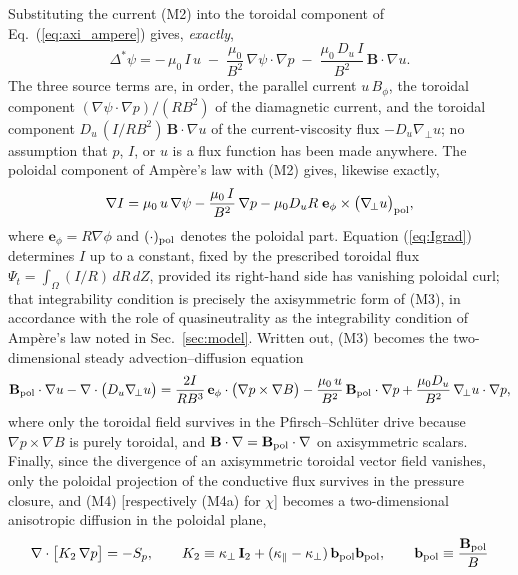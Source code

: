 \documentclass[english]{article}
\newcommand{\bB}{\mathbf{B}}
\newcommand{\bb}{\mathbf{b}}
\newcommand{\bI}{\mathbf{I}}
\newcommand{\gradperp}{\nabla_{\!\perp}}
\begin{document}
Substituting the current (M2) into the toroidal component of Eq.~(\ref{eq:axi_ampere}) gives,
\emph{exactly},
\begin{equation}
\boxed{\;
\Delta^*\psi
=-\,\mu_0\,I\,u
\;-\;\frac{\mu_0}{B^{2}}\,\nabla\psi\cdot\nabla p
\;-\;\frac{\mu_0\,D_u\,I}{B^{2}}\,\bB\cdot\nabla u .
\;}
\label{eq:GSgen}
\end{equation}
The three source terms are, in order, the parallel current $u\,B_\phi$, the toroidal component
$(\nabla\psi\cdot\nabla p)/(RB^{2})$ of the diamagnetic current, and the toroidal component
$D_u\,(I/RB^{2})\,\bB\cdot\nabla u$ of the current-viscosity flux $-D_u\gradperp u$; no assumption
that $p$, $I$, or $u$ is a flux function has been made anywhere. The poloidal component of
Amp\`ere's law with (M2) gives, likewise exactly,
\begin{equation}
\nabla I=\mu_0\,u\,\nabla\psi-\frac{\mu_0\,I}{B^{2}}\,\nabla p
-\mu_0 D_u R\;\mathbf{e}_\phi\times\big(\gradperp u\big)_{\rm pol} ,
\label{eq:Igrad}
\end{equation}
where $\mathbf{e}_\phi=R\nabla\phi$ and $(\cdot)_{\rm pol}$ denotes the poloidal part. Equation
(\ref{eq:Igrad}) determines $I$ up to a constant, fixed by the prescribed toroidal flux
$\Psi_t=\int_\Omega(I/R)\,dR\,dZ$, provided its right-hand side has vanishing poloidal curl; that
integrability condition is precisely the axisymmetric form of (M3), in accordance with the role of
quasineutrality as the integrability condition of Amp\`ere's law noted in Sec.~\ref{sec:model}.
Written out, (M3) becomes the two-dimensional steady advection--diffusion equation
\begin{equation}
\bB_{\rm pol}\cdot\nabla u-\nabla\cdot\big(D_u\gradperp u\big)
=\frac{2I}{RB^{3}}\,\mathbf{e}_\phi\cdot\big(\nabla p\times\nabla B\big)
-\frac{\mu_0\,u}{B^{2}}\,\bB_{\rm pol}\cdot\nabla p
+\frac{\mu_0 D_u}{B^{2}}\,\gradperp u\cdot\nabla p ,
\label{eq:axi_M3}
\end{equation}
where only the toroidal field survives in the Pfirsch--Schl\"uter drive because
$\nabla p\times\nabla B$ is purely toroidal, and $\bB\cdot\nabla=\bB_{\rm pol}\cdot\nabla$ on
axisymmetric scalars. Finally, since the divergence of an axisymmetric toroidal vector field
vanishes, only the poloidal projection of the conductive flux survives in the pressure closure,
and (M4) [respectively (M4a) for $\chi$] becomes a two-dimensional anisotropic diffusion in the
poloidal plane,
\begin{equation}
\nabla\cdot\big[K_{2}\,\nabla p\big]=-S_p ,
\qquad
K_{2}\equiv\kappa_\perp\,\bI_{2}+(\kappa_\parallel-\kappa_\perp)\,\bb_{\rm pol}\bb_{\rm pol} ,
\qquad \bb_{\rm pol}\equiv\frac{\bB_{\rm pol}}{B}
\label{eq:axi_M4}
\end{equation}
\end{document}
